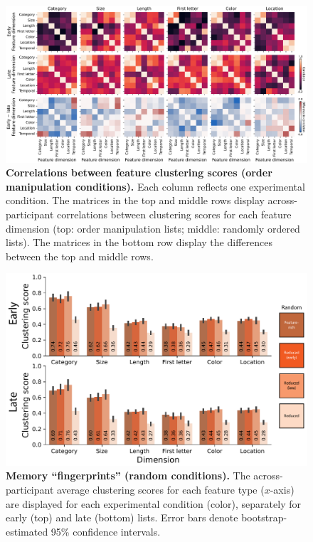 \documentclass{article}
\begin{document}
\begin{figure}[tp] \centering
    \includegraphics[width=\textwidth]{figures/clustering_correlations}
    
    \caption{\textbf{Correlations between feature clustering scores (order manipulation conditions).}  Each column reflects one experimental condition.  The matrices in the top and middle
    rows display across-participant correlations between clustering scores for each feature dimension (top: order manipulation lists; middle: randomly ordered lists).  The matrices
    in the bottom row display the differences between the top and middle rows.}
        \label{fig:clustering-correlations}
\end{figure}


\begin{figure}[tp] \centering
    \includegraphics[width=\textwidth]{figures/fingerprints_random}
    
\caption{\textbf{Memory ``fingerprints'' (random conditions).} The
across-participant average clustering scores for each feature type ($x$-axis) are
displayed for each experimental condition (color), separately for early (top)
and late (bottom) lists. Error bars denote bootstrap-estimated 95\% confidence
intervals.}

\label{fig:fingerprints-random} \end{figure}
    
\end{document}
